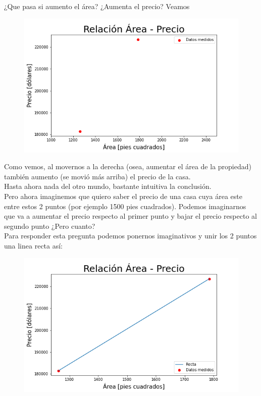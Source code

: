 \documentclass{article}
\begin{document}
¿Que pasa si aumento el área? ¿Aumenta el precio? Veamos
\begin{figure}[h]
\includegraphics[scale=0.5]{Imagenes/2_puntos.png}
\centering
\end{figure}
\newpage
Como vemos, al movernos a la derecha (osea, aumentar el área de la propiedad) también aumento (se movió más arriba) el precio de la casa.\\
Hasta ahora nada del otro mundo, bastante intuitiva la conclusión.\\
Pero ahora imaginemos que quiero saber el precio de una casa cuya área este entre estos 2 puntos (por ejemplo 1500 pies cuadrados). Podemos imaginarnos que va a aumentar el precio respecto al primer punto y bajar el precio respecto al segundo punto ¿Pero cuanto?\\
Para responder esta pregunta podemos ponernos imaginativos y unir los 2 puntos una linea recta así:
\begin{figure}[h!]
\includegraphics[scale=0.5]{Imagenes/recta.png}
\centering
\end{figure}
\end{document}
